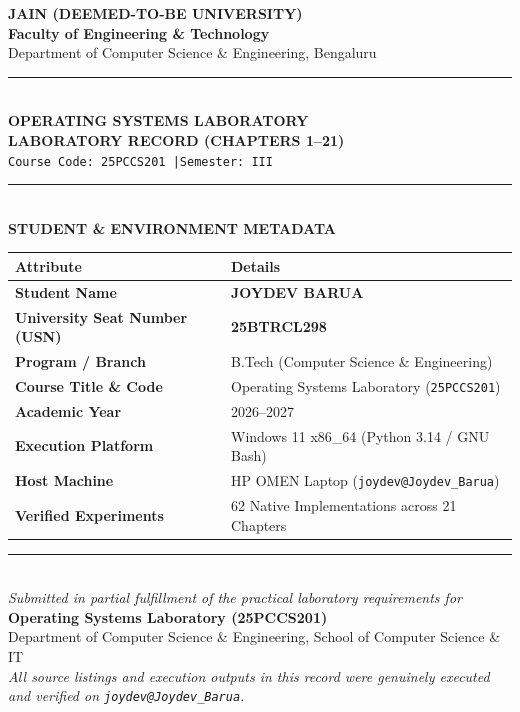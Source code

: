 \documentclass[11pt,a4paper]{report}
\begin{document}
\thispagestyle{empty}
\begin{center}
  \vspace*{0.4cm}
  {\LARGE\bfseries\textcolor{jainnavy}{JAIN (DEEMED-TO-BE UNIVERSITY)}}\\[0.25cm]
  {\large\textbf{Faculty of Engineering \& Technology}}\\[0.1cm]
  {\normalsize Department of Computer Science \& Engineering, Bengaluru}\\[1.1cm]

  \textcolor{jainnavy}{\rule{\textwidth}{1.8pt}}\\[0.45cm]
  {\Huge\bfseries\textcolor{jainnavy}{OPERATING SYSTEMS LABORATORY}}\\[0.35cm]
  {\Large\bfseries LABORATORY RECORD (CHAPTERS 1--21)}\\[0.3cm]
  {\normalsize\texttt{Course Code: 25PCCS201 \quad|\quad Semester: III}}\\[0.35cm]
  \textcolor{jainnavy}{\rule{\textwidth}{1.8pt}}\\[1.3cm]

  {\large\textbf{STUDENT \& ENVIRONMENT METADATA}}\\[0.35cm]
  \begin{tabular}{@{}ll@{}}
    \toprule
    \textbf{Attribute} & \textbf{Details} \\
    \midrule
    \textbf{Student Name} & \textbf{JOYDEV BARUA} \\
    \textbf{University Seat Number (USN)} & \textbf{25BTRCL298} \\
    \textbf{Program / Branch} & B.Tech (Computer Science \& Engineering) \\
    \textbf{Course Title \& Code} & Operating Systems Laboratory (\texttt{25PCCS201}) \\
    \textbf{Academic Year} & 2026--2027 \\
    \textbf{Execution Platform} & Windows 11 x86\_64 (Python 3.14 / GNU Bash) \\
    \textbf{Host Machine} & HP OMEN Laptop (\texttt{joydev@Joydev\_Barua}) \\
    \textbf{Verified Experiments} & 62 Native Implementations across 21 Chapters \\
    \bottomrule
  \end{tabular}

  \vfill
  \textcolor{rulegray}{\rule{0.75\textwidth}{0.6pt}}\\[0.35cm]
  {\small\textit{Submitted in partial fulfillment of the practical laboratory requirements for}}\\[0.1cm]
  {\small\textbf{Operating Systems Laboratory (25PCCS201)}}\\
  {\small Department of Computer Science \& Engineering, School of Computer Science \& IT}\\[0.2cm]
  {\small\textit{All source listings and execution outputs in this record were genuinely executed and verified on \texttt{joydev@Joydev\_Barua}.}}
  \vspace*{0.4cm}
\end{center}
\clearpage
\end{document}
